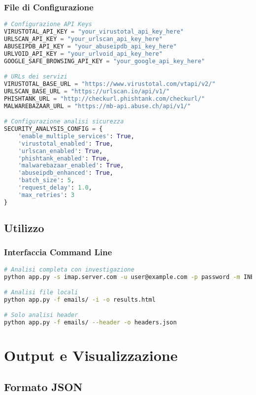 \documentclass{article}
\begin{document}
\subsubsection{File di Configurazione}
\begin{lstlisting}[language=Python, caption=Configurazione chiavi API]
# Configurazione API Keys
VIRUSTOTAL_API_KEY = "your_virustotal_api_key_here"
URLSCAN_API_KEY = "your_urlscan_api_key_here"
ABUSEIPDB_API_KEY = "your_abuseipdb_api_key_here"
URLVOID_API_KEY = "your_urlvoid_api_key_here"
GOOGLE_SAFE_BROWSING_API_KEY = "your_google_api_key_here"

# URLs dei servizi
VIRUSTOTAL_BASE_URL = "https://www.virustotal.com/vtapi/v2/"
URLSCAN_BASE_URL = "https://urlscan.io/api/v1/"
PHISHTANK_URL = "http://checkurl.phishtank.com/checkurl/"
MALWAREBAZAAR_URL = "https://mb-api.abuse.ch/api/v1/"

# Configurazione analisi sicurezza
SECURITY_ANALYSIS_CONFIG = {
    'enable_multiple_services': True,
    'virustotal_enabled': True,
    'urlscan_enabled': True,
    'phishtank_enabled': True,
    'malwarebazaar_enabled': True,
    'abuseipdb_enhanced': True,
    'batch_size': 5,
    'request_delay': 1.0,
    'max_retries': 3
}
\end{lstlisting}

\subsection{Utilizzo}

\subsubsection{Interfaccia Command Line}
\begin{lstlisting}[language=bash, caption=Esempi utilizzo CLI]
# Analisi completa con investigazione
python app.py -s imap.server.com -u user@example.com -p password -m INBOX -o emails --complete --investigate

# Analisi file locali
python app.py -f emails/ -i -o results.html

# Solo analisi header
python app.py -f emails/ --header -o headers.json
\end{lstlisting}

\section{Output e Visualizzazione}

\subsection{Formato JSON}
\end{document}

